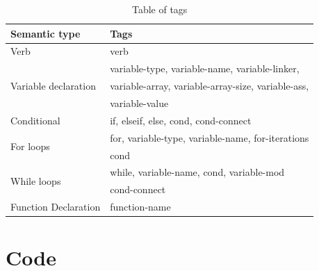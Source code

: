 \documentclass[fyp]{socreport}
\begin{document}
\begin{table}[h!]
\centering
\begin{tabular}{ |p{3cm}|p{10cm}|  }
   \hline
   \textbf{Semantic type} & \textbf{Tags} \\
   \hline
   Verb & verb \\
   \hline
   \multirow{3}{3cm}{Variable declaration} & variable-type, variable-name, variable-linker, \\
                                           & variable-array, variable-array-size, variable-ass,\\
                                           & variable-value \\

   \hline
   Conditional & if, elseif, else, cond, cond-connect \\

   \hline
   \multirow{2}{3cm}{For loops} & for, variable-type, variable-name, for-iterations \\
                                & cond \\

   \hline
   \multirow{2}{3cm}{While loops} & while, variable-name, cond, variable-mod \\
                                  & cond-connect \\
   \hline
   Function Declaration & function-name \\
   \hline
  \end{tabular}
  \caption{Table of tags}
  \label{table:1}
\end{table}

\chapter{Code}
\end{document}
